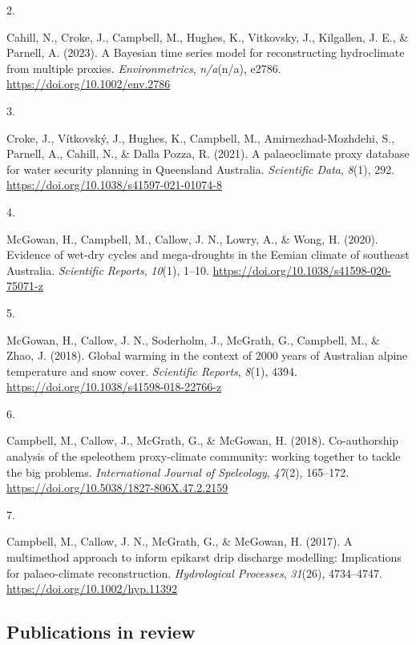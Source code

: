 \documentclass[11pt,a4paper,]{moderncv}
\newlength{\csllabelwidth}
\newcommand{\CSLLeftMargin}[1]{\parbox[t]{\csllabelwidth}{#1}}
\newcommand{\CSLRightInline}[1]{\parbox[t]{\linewidth - \csllabelwidth}{#1}}
\begin{document}
\leavevmode{}%
\CSLLeftMargin{2. }%
\CSLRightInline{Cahill, N., Croke, J., Campbell, M., Hughes, K.,
Vitkovsky, J., Kilgallen, J. E., \& Parnell, A. (2023). A Bayesian time
series model for reconstructing hydroclimate from multiple proxies.
\emph{Environmetrics}, \emph{n/a}(n/a), e2786.
\url{https://doi.org/10.1002/env.2786}}

\leavevmode{}%
\CSLLeftMargin{3. }%
\CSLRightInline{Croke, J., Vítkovský, J., Hughes, K., Campbell, M.,
Amirnezhad-Mozhdehi, S., Parnell, A., Cahill, N., \& Dalla Pozza, R.
(2021). A palaeoclimate proxy database for water security planning in
Queensland Australia. \emph{Scientific Data}, \emph{8}(1), 292.
\url{https://doi.org/10.1038/s41597-021-01074-8}}

\leavevmode{}%
\CSLLeftMargin{4. }%
\CSLRightInline{McGowan, H., Campbell, M., Callow, J. N., Lowry, A., \&
Wong, H. (2020). Evidence of wet-dry cycles and mega-droughts in the
Eemian climate of southeast Australia. \emph{Scientific Reports},
\emph{10}(1), 1--10. \url{https://doi.org/10.1038/s41598-020-75071-z}}

\leavevmode{}%
\CSLLeftMargin{5. }%
\CSLRightInline{McGowan, H., Callow, J. N., Soderholm, J., McGrath, G.,
Campbell, M., \& Zhao, J. (2018). Global warming in the context of 2000
years of Australian alpine temperature and snow cover. \emph{Scientific
Reports}, \emph{8}(1), 4394.
\url{https://doi.org/10.1038/s41598-018-22766-z}}

\leavevmode{}%
\CSLLeftMargin{6. }%
\CSLRightInline{Campbell, M., Callow, J., McGrath, G., \& McGowan, H.
(2018). Co-authorship analysis of the speleothem proxy-climate
community: working together to tackle the big problems.
\emph{International Journal of Speleology}, \emph{47}(2), 165--172.
\url{https://doi.org/10.5038/1827-806X.47.2.2159}}

\leavevmode{}%
\CSLLeftMargin{7. }%
\CSLRightInline{Campbell, M., Callow, J. N., McGrath, G., \& McGowan, H.
(2017). A multimethod approach to inform epikarst drip discharge
modelling: Implications for palaeo-climate reconstruction.
\emph{Hydrological Processes}, \emph{31}(26), 4734--4747.
\url{https://doi.org/10.1002/hyp.11392}}

\hypertarget{publications-in-review}{%
\subsection{Publications in review}\label{publications-in-review}}
\end{document}
